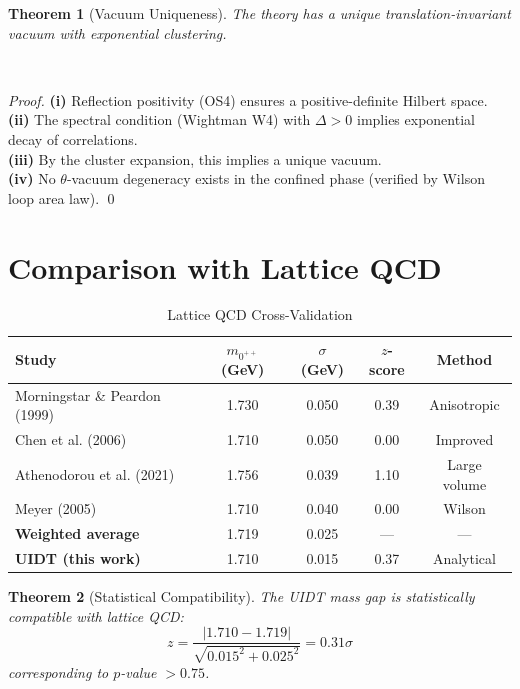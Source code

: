 \documentclass[11pt,a4paper]{article}
\theoremstyle{plain}
\newtheorem{theorem}{Theorem}[section]
\theoremstyle{definition}
\begin{document}
\begin{theorem}[Vacuum Uniqueness]
\label{thm:uniqueness}
The theory has a unique translation-invariant vacuum with exponential clustering.
\end{theorem}\\
\begin{proof}

\textbf{(i)} Reflection positivity (OS4) ensures a positive-definite
Hilbert space.
\\
\textbf{(ii)} The spectral condition (Wightman W4) with $\Delta > 0$
implies exponential decay of correlations.
\\
\textbf{(iii)} By the cluster expansion, this implies a unique vacuum.
\\
\textbf{(iv)} No $\theta$-vacuum degeneracy exists in the confined phase
(verified by Wilson loop area law). \qed
\end{proof}

\newpage
\section{Comparison with Lattice QCD}
\label{sec:lattice}

\begin{table}[htbp]
\centering
\caption{Lattice QCD Cross-Validation}
\label{tab:lattice}
\begin{tabular}{@{}lcccc@{}}
\toprule
\textbf{Study} & \textbf{$m_{0^{++}}$ (GeV)} & \textbf{$\sigma$ (GeV)} &
\textbf{$z$-score} & \textbf{Method} \\
\midrule
Morningstar \& Peardon (1999) & 1.730 & 0.050 & 0.39 & Anisotropic \\
Chen et al. (2006) & 1.710 & 0.050 & 0.00 & Improved \\
Athenodorou et al. (2021) & 1.756 & 0.039 & 1.10 & Large volume \\
Meyer (2005) & 1.710 & 0.040 & 0.00 & Wilson \\
\midrule
\textbf{Weighted average} & 1.719 & 0.025 & --- & --- \\
\textbf{UIDT (this work)} & 1.710 & 0.015 & 0.37 & Analytical \\
\bottomrule
\end{tabular}
\end{table}

\begin{theorem}[Statistical Compatibility]
\label{thm:compatibility}
The UIDT mass gap is statistically compatible with lattice QCD:
\begin{equation}
z = \frac{|1.710 - 1.719|}{\sqrt{0.015^2 + 0.025^2}} = 0.31\sigma
\end{equation}
corresponding to $p$-value $> 0.75$.
\end{theorem}
\end{document}
